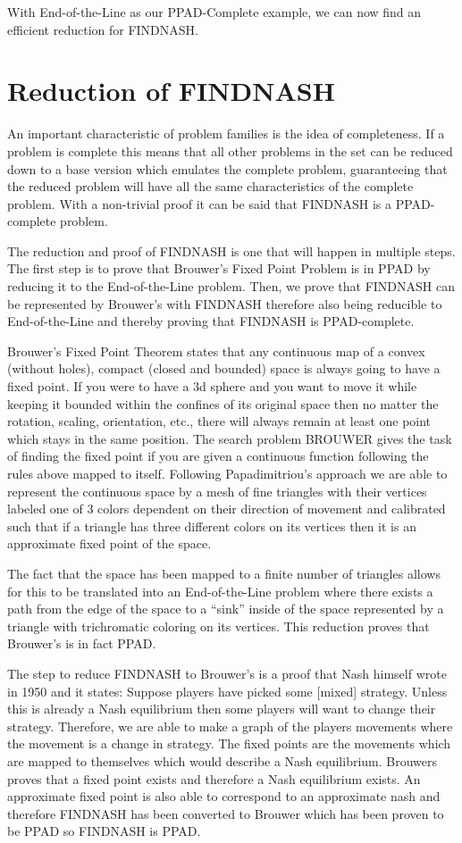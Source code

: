 \documentclass[10pt]{article}
\theoremstyle{definition}
\theoremstyle{remark}
\theoremstyle{definition}
\begin{document}
With End-of-the-Line as our PPAD-Complete example, we can now find an efficient reduction for FINDNASH. 

\section{Reduction of FINDNASH}
An important characteristic of problem families is the idea of completeness. If a problem is complete this means that all other problems in the set can be reduced down to a base version which emulates the complete problem, guaranteeing that the reduced problem will have all the same characteristics of the complete problem. With a non-trivial proof it can be said that FINDNASH is a PPAD-complete problem.

The reduction and proof of FINDNASH is one that will happen in multiple steps. The first step is to prove that Brouwer’s Fixed Point Problem is in PPAD by reducing it to the End-of-the-Line problem. Then, we prove that FINDNASH can be represented by Brouwer’s with FINDNASH therefore also being reducible to End-of-the-Line and thereby proving that FINDNASH is PPAD-complete. 

Brouwer’s Fixed Point Theorem states that any continuous map of a convex (without holes), compact (closed and bounded) space is always going to have a fixed point. If you were to have a 3d sphere and you want to move it while keeping it bounded within the confines of its original space then no matter the rotation, scaling, orientation, etc., there will always remain at least one point which stays in the same position. The search problem BROUWER gives the task of finding the fixed point if you are given a continuous function following the rules above mapped to itself. Following Papadimitriou’s approach \cite{daskalakis2006complexity} we are able to represent the continuous space by a mesh of fine triangles with their vertices labeled one of 3 colors dependent on their direction of movement and calibrated such that if a triangle has three different colors on its vertices then it is an approximate fixed point of the space. 

The fact that the space has been mapped to a finite number of triangles allows for this to be translated into an End-of-the-Line problem where there exists a path from the edge of the space to a “sink” inside of the space represented by a triangle with trichromatic coloring on its vertices. This reduction proves that Brouwer’s is in fact PPAD. 

The step to reduce FINDNASH to Brouwer’s is a proof that Nash himself wrote in 1950 and it states: Suppose players have picked some [mixed] strategy. Unless this is already a Nash equilibrium then some players will want to change their strategy. Therefore, we are able to make a graph of the players movements where the movement is a change in strategy. The fixed points are the movements which are mapped to themselves which would describe a Nash equilibrium. Brouwers proves that a fixed point exists and therefore a Nash equilibrium exists. An approximate fixed point is also able to correspond to an approximate nash and therefore FINDNASH has been converted to Brouwer which has been proven to be PPAD so FINDNASH is PPAD. 
\end{document}
